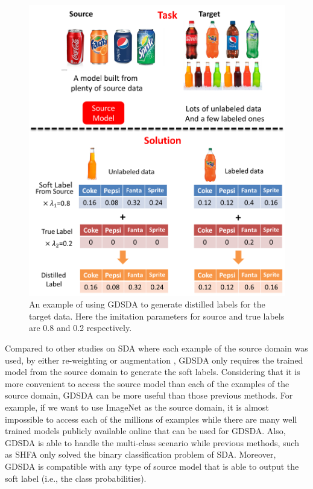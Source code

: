 \begin{figure}
	\centering
	\includegraphics[scale=.8]{aaai/figure/explain.png}
	\caption{An example of using GDSDA to generate distilled labels for the target data. Here the imitation parameters for source and true labels are 0.8 and 0.2 respectively.}\label{fig:aaai:explain}
\end{figure}


Compared to other studies on SDA where each example of the source domain was used, by either re-weighting \cite{Donahue_2013_CVPR,duan2012visual} or augmentation \cite{daume2010frustratingly}, GDSDA only requires the trained model from the source domain to generate the soft labels. Considering that it is more convenient to access the source model than each of the examples of the source domain, GDSDA can be more useful than those previous methods. For example, if we want to use ImageNet \cite{imagenet_cvpr09} as the source domain, it is almost impossible to access each of the millions of examples while there are many well trained models publicly available online that can be used for GDSDA. Also, GDSDA is able to handle the multi-class scenario while previous methods, such as SHFA\cite{duan2012learning} only solved the binary classification problem of SDA. Moreover, GDSDA is compatible with any type of source model that is able to output the soft label (i.e., the class probabilities).

